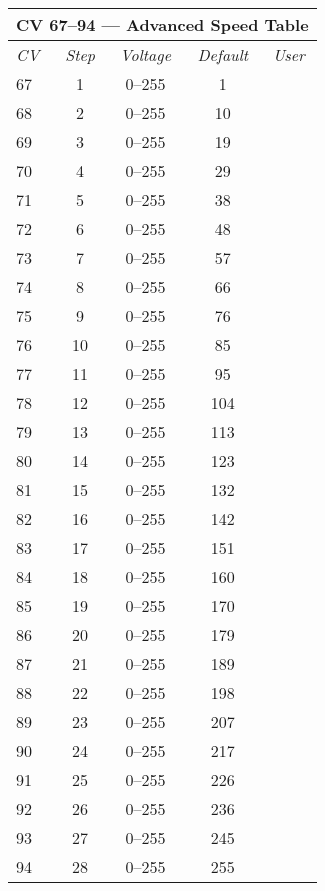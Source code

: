 \documentclass[12pt,letterpaper,draft]{memoir} %
\begin{document}
\begin{center}
\begin{longtable}{|l|c|c|c|c|}
\hline
\multicolumn{5}{|c|}{\textbf{CV 67--94 --- Advanced Speed Table}} \\ \hline \hline
\textit{CV}	& \textit{Step}	& \textit{Voltage}	& \textit{Default}	& \textit{User}	\\ \hline
67		& 1			& 0--255			& 1				&			\\ \hline
68		& 2			& 0--255			& 10				&			\\ \hline
69		& 3			& 0--255			& 19				&			\\ \hline
70		& 4			& 0--255			& 29				&			\\ \hline
71		& 5			& 0--255			& 38				&			\\ \hline
72		& 6			& 0--255			& 48				&			\\ \hline
73		& 7			& 0--255			& 57				&			\\ \hline
74		& 8			& 0--255			& 66				&			\\ \hline
75		& 9			& 0--255			& 76				&			\\ \hline
76		& 10			& 0--255			& 85				&			\\ \hline
77		& 11			& 0--255			& 95				&			\\ \hline
78		& 12			& 0--255			& 104			&			\\ \hline
79		& 13			& 0--255			& 113			&			\\ \hline
80		& 14			& 0--255			& 123			&			\\ \hline
81		& 15			& 0--255			& 132			&			\\ \hline
82		& 16			& 0--255			& 142			&			\\ \hline
83		& 17			& 0--255			& 151			&			\\ \hline
84		& 18			& 0--255			& 160			&			\\ \hline
85		& 19			& 0--255			& 170			&			\\ \hline
86		& 20			& 0--255			& 179			&			\\ \hline
87		& 21			& 0--255			& 189			&			\\ \hline
88		& 22			& 0--255			& 198			&			\\ \hline
89		& 23			& 0--255			& 207			&			\\ \hline
90		& 24			& 0--255			& 217			&			\\ \hline
91		& 25			& 0--255			& 226			&			\\ \hline
92		& 26			& 0--255			& 236			&			\\ \hline
93		& 27			& 0--255			& 245			&			\\ \hline
94		& 28			& 0--255			& 255			&			\\ \hline
\end{longtable}
\end{center}
\end{document}
